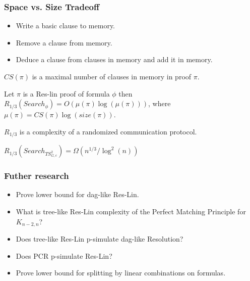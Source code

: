 \begin{frame}
    \frametitle{Space vs. Size Tradeoff}

    \pause
    \begin{itemize}
    	\item Write a basic clause to memory.
    	\item Remove a clause from memory.
    	\item Deduce a clause from clauses in memory and add it in memory.
    \end{itemize}

    \pause
    $CS(\pi)$ is a maximal number of clauses in memory in proof $\pi$.

    \pause
    \begin{theorem}
        Let $\pi$ is a Res-lin proof of formula $\phi$ then $R_{1 / 3}(Search_{\phi})
        = O(\mu(\pi) \log(\mu(\pi)))$, where $\mu(\pi) = CS(\pi) \log(size(\pi))$.
    \end{theorem}

    $R_{1 / 3}$ is a complexity of a randomized communication protocol.
    
    \pause

    $R_{1 / 3}(Search_{TS_{G,c}^2}) = \Omega(n^{1 / 3} / \log^2(n))$
\end{frame}


\begin{frame}
    \frametitle{Futher research}

    \begin{itemize}
		\item Prove lower bound for dag-like Res-Lin.
		\item What is tree-like Res-Lin complexity of the Perfect Matching Principle
		    for $K_{n - 2, n}$? 
		\item Does tree-like Res-Lin p-simulate dag-like Resolution?
		\item Does PCR p-simulate Res-Lin?
		\item Prove lower bound for splitting by linear combinations on
		     formulas.
	\end{itemize}
\end{frame}


